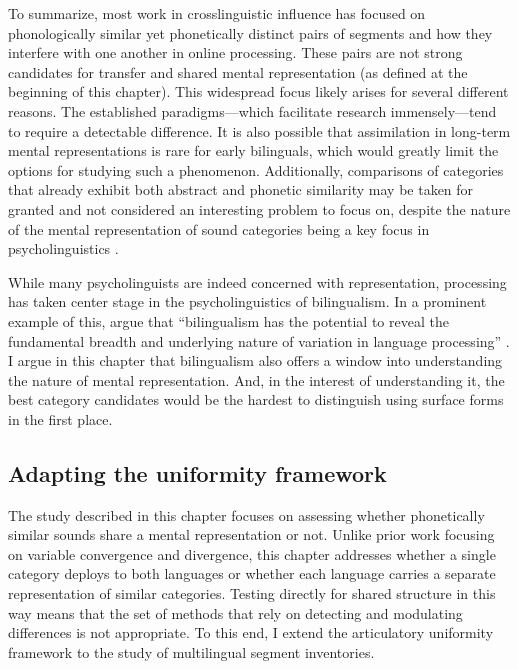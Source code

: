 To summarize, most work in crosslinguistic influence has focused on phonologically similar yet phonetically distinct pairs of segments and how they interfere with one another in online processing. These pairs are not strong candidates for transfer and shared mental representation (as defined at the beginning of this chapter). This widespread focus likely arises for several different reasons. The established paradigms---which facilitate research immensely---tend to require a detectable difference. It is also possible that assimilation in long-term mental representations is rare for early bilinguals, which would greatly limit the options for studying such a phenomenon. Additionally, comparisons of categories that already exhibit both abstract and phonetic similarity may be taken for granted and not considered an interesting problem to focus on, despite the nature of the mental representation of sound categories being a key focus in psycholinguistics \citep{samuel_2020_resist}. 

While many psycholinguists are indeed concerned with representation, processing has taken center stage in the psycholinguistics of bilingualism. In a prominent example of this, \citet{fricke_2019_bilingualism} argue that ``bilingualism has the potential to reveal the fundamental breadth and underlying nature of variation in language processing'' \citeyearpar[][p. 204]{fricke_2019_bilingualism}. I argue in this chapter that bilingualism also offers a window into understanding the nature of mental representation. And, in the interest of understanding it, the best category candidates would be the hardest to distinguish using surface forms in the first place. 

\subsection{Adapting the uniformity framework}\label{ch4:sec:uniformity}

The study described in this chapter focuses on assessing whether phonetically similar sounds share a mental representation or not. Unlike prior work focusing on variable convergence and divergence, this chapter addresses whether a single category deploys to both languages or whether each language carries a separate representation of similar categories. Testing directly for shared structure in this way means that the set of methods that rely on detecting and modulating differences is not appropriate. To this end, I extend the articulatory uniformity framework to the study of multilingual segment inventories. 

